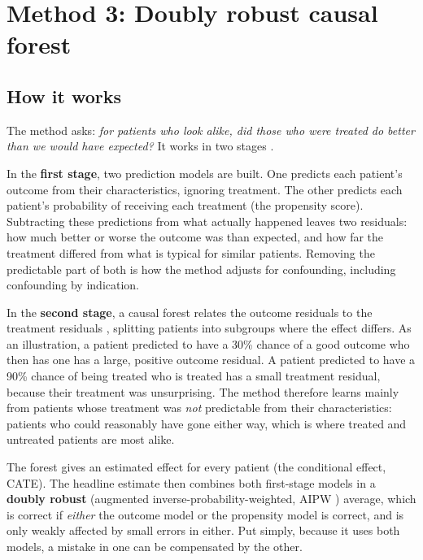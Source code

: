 \section{Method 3: Doubly robust causal forest}

\subsection{How it works}

The method asks: \emph{for patients who look alike, did those who were treated do better than we would have expected?} It works in two stages \cite{chernozhukov2018,wager2018,athey2019}.

In the \textbf{first stage}, two prediction models are built. One predicts each patient's outcome from their characteristics, ignoring treatment. The other predicts each patient's probability of receiving each treatment (the propensity score). Subtracting these predictions from what actually happened leaves two residuals: how much better or worse the outcome was than expected, and how far the treatment differed from what is typical for similar patients. Removing the predictable part of both is how the method adjusts for confounding, including confounding by indication.

In the \textbf{second stage}, a causal forest relates the outcome residuals to the treatment residuals \cite{nie2021,athey2019}, splitting patients into subgroups where the effect differs. As an illustration, a patient predicted to have a 30\% chance of a good outcome who then has one has a large, positive outcome residual. A patient predicted to have a 90\% chance of being treated who is treated has a small treatment residual, because their treatment was unsurprising. The method therefore learns mainly from patients whose treatment was \emph{not} predictable from their characteristics: patients who could reasonably have gone either way, which is where treated and untreated patients are most alike.

The forest gives an estimated effect for every patient (the conditional effect, CATE). The headline estimate then combines both first-stage models in a \textbf{doubly robust} (augmented inverse-probability-weighted, AIPW \cite{robins1994}) average, which is correct if \emph{either} the outcome model or the propensity model is correct, and is only weakly affected by small errors in either. Put simply, because it uses both models, a mistake in one can be compensated by the other.

